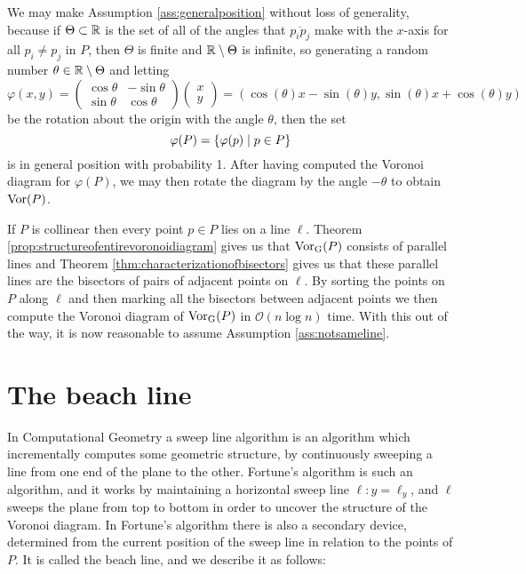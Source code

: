 \begin{rmk}
We may make Assumption \ref{ass:generalposition} without loss of generality, because if $\Theta \subset \mathbb{R}$ is the set of all of the angles that $\overline{p_i p_j}$ make with the $x$-axis for all $p_i \ne p_j$ in $P$, then $\Theta$ is finite and $\mathbb{R} \setminus \Theta$ is infinite, so generating a random number $\theta \in \mathbb{R} \setminus \Theta$ and letting
\[
    \varphi (x, y) = \begin{pmatrix} \cos \theta & -\sin \theta \\ \sin \theta & \cos \theta \end{pmatrix} \begin{pmatrix} x \\ y \end{pmatrix}
    = (\cos(\theta) x - \sin(\theta) y, \sin(\theta) x + \cos(\theta) y)
\]
be the rotation about the origin with the angle $\theta$, then the set
\[
    \varphi(P) = \{\varphi(p) \mid p \in P\}
\]
is in general position with probability 1. After having computed the Voronoi diagram for $\varphi(P)$, we may then rotate the diagram by the angle $-\theta$ to obtain $\operatorname{Vor}(P)$.
\end{rmk}

\begin{rmk}
If $P$ is collinear then every point $p \in P$ lies on a line $\ell$. Theorem \ref{prop:structureofentirevoronoidiagram} gives us that $\operatorname{Vor_{G}}(P)$ consists of parallel lines and Theorem \ref{thm:characterizationofbisectors} gives us that these parallel lines are the bisectors of pairs of adjacent points on $\ell$. By sorting the points on $P$ along $\ell$ and then marking all the bisectors between adjacent points we then compute the Voronoi diagram of $\operatorname{Vor_{G}}(P)$ in $\mathcal{O}(n \log n)$ time. With this out of the way, it is now reasonable to assume Assumption \ref{ass:notsameline}.
\end{rmk}

\section{The beach line}
In Computational Geometry a sweep line algorithm is an algorithm which incrementally computes some geometric structure, by continuously sweeping a line from one end of the plane to the other. Fortune's algorithm is such an algorithm, and it works by maintaining a horizontal sweep line $\ell \colon y = \ell_y$, and $\ell$ sweeps the plane from top to bottom in order to uncover the structure of the Voronoi diagram. In Fortune's algorithm there is also a secondary device, determined from the current position of the sweep line in relation to the points of $P$. It is called the beach line, and we describe it as follows:


